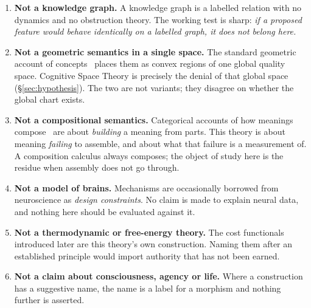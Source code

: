 \begin{enumerate}
  \item \textbf{Not a knowledge graph.} A knowledge graph is a labelled
    relation with no dynamics and no obstruction theory. The working test is
    sharp: \emph{if a proposed feature would behave identically on a labelled
    graph, it does not belong here.}
  \item \textbf{Not a geometric semantics in a single space.} The standard
    geometric account of concepts~\cite{Gardenfors} places them as convex
    regions of one global quality space. Cognitive Space Theory is precisely
    the denial of that global space (\S\ref{sec:hypothesis}). The two are not
    variants; they disagree on whether the global chart exists.
  \item \textbf{Not a compositional semantics.} Categorical accounts of how
    meanings compose~\cite{CoeckeSadrzadehClark} are about \emph{building}
    a meaning from parts. This theory is about meaning \emph{failing} to
    assemble, and about what that failure is a measurement of. A composition
    calculus always composes; the object of study here is the residue when
    assembly does not go through.
  \item \textbf{Not a model of brains.} Mechanisms are occasionally borrowed
    from neuroscience as \emph{design constraints}. No claim is made to
    explain neural data, and nothing here should be evaluated against it.
  \item \textbf{Not a thermodynamic or free-energy theory.} The cost
    functionals introduced later are this theory's own construction. Naming
    them after an established principle would import authority that has not
    been earned.
  \item \textbf{Not a claim about consciousness, agency or life.} Where a
    construction has a suggestive name, the name is a label for a morphism and
    nothing further is asserted.
\end{enumerate}

